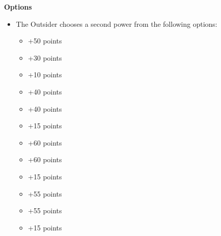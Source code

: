 \begin{minipage}[t]{0.72\textwidth}
	\vspace*{2em}
	\textbf{Options}
	\begin{itemize}
		\item The Outsider chooses a second power from the following options:
		\begin{itemize}
			\item {} \dotfill +50 points
			\item {} \dotfill +30 points
			\item {} \dotfill +10 points
			\item {} \dotfill +40 points
			\item {} \dotfill +40 points
			\item {} \dotfill +15 points
			\item {} \dotfill +60 points
			\item {} \dotfill +60 points
			\item {} \dotfill +15 points
			\item {} \dotfill +55 points
			\item {} \dotfill +55 points
			\item {} \dotfill +15 points
		\end{itemize}
	\end{itemize}
\end{minipage}




